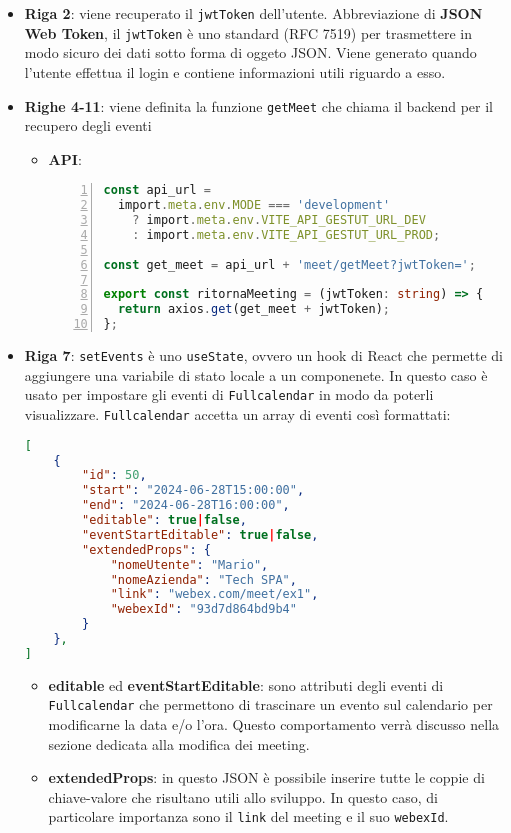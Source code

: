 \begin{itemize}
    \item \textbf{Riga 2}: viene recuperato il \texttt{jwtToken} dell'utente. Abbreviazione di \textbf{JSON Web Token}, 
    il \texttt{jwtToken} è uno standard (RFC 7519) per trasmettere in modo sicuro dei dati sotto forma di oggeto JSON. \cite{jwtToken}
    Viene generato quando l'utente effettua il login e contiene informazioni utili riguardo a esso.
    \item \textbf{Righe 4-11}: viene definita la funzione \texttt{getMeet} che chiama il backend per il recupero degli eventi 
        \begin{itemize}
            \item \textbf{API}:
            \begin{lstlisting}[language=typescript, frame=lines, basicstyle=\ttfamily\scriptsize, numbers=left]
const api_url =
  import.meta.env.MODE === 'development'
    ? import.meta.env.VITE_API_GESTUT_URL_DEV
    : import.meta.env.VITE_API_GESTUT_URL_PROD;

const get_meet = api_url + 'meet/getMeet?jwtToken=';

export const ritornaMeeting = (jwtToken: string) => {
  return axios.get(get_meet + jwtToken);
};

            \end{lstlisting}
        \end{itemize}

    \item \textbf{Riga 7}: \texttt{setEvents} è uno \texttt{useState}, ovvero un hook di React che permette di aggiungere
    una variabile di stato locale a un componenete. \cite{reactUseState} In questo caso è usato per impostare gli eventi 
    di \texttt{Fullcalendar} in modo da poterli visualizzare. \texttt{Fullcalendar} accetta un array di eventi così formattati:
\begin{lstlisting}[language=json,firstnumber=1]
[
    {
        "id": 50,
        "start": "2024-06-28T15:00:00",
        "end": "2024-06-28T16:00:00",
        "editable": true|false,
        "eventStartEditable": true|false,
        "extendedProps": {
            "nomeUtente": "Mario",
            "nomeAzienda": "Tech SPA",
            "link": "webex.com/meet/ex1",
            "webexId": "93d7d864bd9b4"
        }
    },                   
]               
\end{lstlisting}
    \begin{itemize}
        \item \textbf{editable} ed \textbf{eventStartEditable}: sono attributi degli eventi di \texttt{Fullcalendar}
        che permettono di trascinare un evento sul calendario per modificarne la data e/o l'ora. Questo comportamento verrà
        discusso nella sezione dedicata alla modifica dei meeting.
        \item \textbf{extendedProps}: in questo JSON è possibile inserire tutte le coppie di chiave-valore che risultano
        utili allo sviluppo. In questo caso, di particolare importanza sono il \texttt{link} del meeting e il suo \texttt{webexId}.
    \end{itemize}


\end{itemize}
